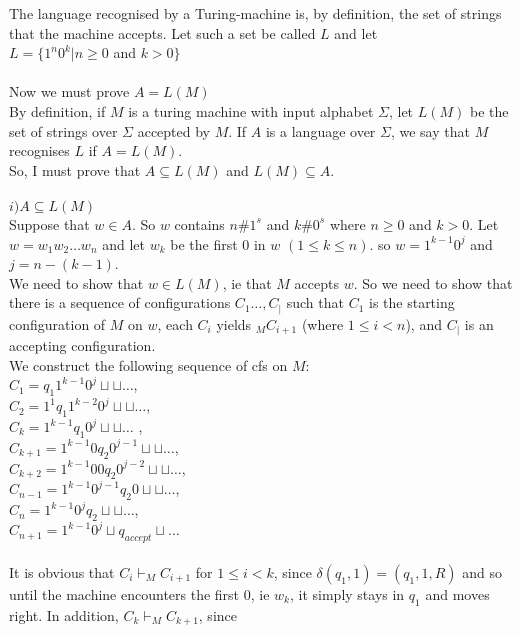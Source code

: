 \documentclass[a4paper,12pt]{article}
\begin{document}
The language recognised by a Turing-machine is, by definition, the set of strings that the machine accepts. Let such a set be called $L$ and let \\
$L=\{1^n 0^k | n \geq 0$ and $k > 0\}$ \\
\\
Now we must prove $A=L(M)$ \\
By definition, if $M$ is a turing machine with input alphabet $\Sigma$, let $L(M)$ be the set of strings over $\Sigma$ accepted by $M$. If $A$ is a language over $\Sigma$, we say that $M$ recognises $L$ if $A=L(M)$. \\
So, I must prove that $A \subseteq L(M)$ and $L(M) \subseteq A$. \\
\\
$i) A \subseteq L(M)$ \\
Suppose that $w \in A$. So $w$ contains $n\#1^s$ and $k\#0^s$ where $n \geq 0$ and $k > 0$. Let $w = w_1 w_2 \dots w_n$ and let $w_k$ be the first $0$ in $w$ $(1 \leq  k \leq n)$.
so $w = 1^{k-1}0^{j}$ and $j = n - ( k - 1)$. \\ 
We need to show that $w \in L(M)$, ie that $M$ accepts $w$. So we need to show that there is a sequence of configurations $C_1 \dots, C_|$ such that $C_1$ is the starting configuration of $M$ on $w$, each $C_i$ yields $_M C_{i+1}$ (where $1 \leq i < n $), and $C_|$ is an accepting configuration. \\
We construct the following sequence of cfs on $M$: \\
$C_1 = q_1 1^{k-1} 0^j \sqcup \sqcup \dots$, \\
$C_2 = 1^1 q_1 1^{k-2} 0^j \sqcup \sqcup \dots$, \\
$C_k = 1^{k-1} q_1 0^j \sqcup \sqcup \dots$ , \\
$C_{k+1} = 1^{k-1} 0 q_2 0^{j-1} \sqcup \sqcup \dots$, \\
$C_{k+2} = 1^{k-1} 0 0 q_2 0^{j-2} \sqcup \sqcup \dots$, \\
$C_{n-1} = 1^{k-1} 0^{j-1} q_2 0 \sqcup \sqcup \dots$, \\
$C_n = 1^{k-1} 0^j q_2 \sqcup \sqcup \dots$, \\
$C_{n+1} = 1^{k-1} 0^j \sqcup q_{accept} \sqcup \dots$ \\
\\
It is obvious that $C_i \vdash_M C_{i+1}$ for $1 \leq i < k$, since 
$\delta ( q_1 , 1 ) = ( q_1 , 1 , R )$ and so until the machine encounters the first $0$, ie $w_k$, it simply stays in $q_1$ and moves right. In  addition, $C_k \vdash_M C_{k+1}$, since 
\end{document}
